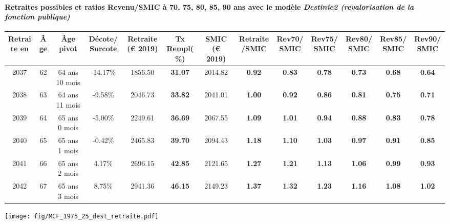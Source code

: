 \paragraph{Retraites possibles et ratios Revenu/SMIC à 70, 75, 80, 85, 90 ans avec le modèle \emph{Destinie2 (revalorisation de la fonction publique)}}  
 
{ \scriptsize \begin{center} 
\begin{tabular}[htb]{|c|c||c|c||c|c||c||c|c|c|c|c|c|} 
\hline 
 Retraite en &  Âge &  Âge pivot &  Décote/Surcote &  Retraite (\euro{} 2019) &  Tx Rempl(\%) &  SMIC (\euro{} 2019) &  Retraite/SMIC &  Rev70/SMIC &  Rev75/SMIC &  Rev80/SMIC &  Rev85/SMIC &  Rev90/SMIC \\ 
\hline \hline 
 2037 &  62 &  64 ans 10 mois &  -14.17\% &  1856.50 &  {\bf 31.07} &  2014.82 &  {\bf {\color{red} 0.92}} &  {\bf {\color{red} 0.83}} &  {\bf {\color{red} 0.78}} &  {\bf {\color{red} 0.73}} &  {\bf {\color{red} 0.68}} &  {\bf {\color{red} 0.64}} \\ 
\hline 
 2038 &  63 &  64 ans 11 mois &  -9.58\% &  2046.73 &  {\bf 33.82} &  2041.01 &  {\bf 1.00} &  {\bf {\color{red} 0.92}} &  {\bf {\color{red} 0.86}} &  {\bf {\color{red} 0.81}} &  {\bf {\color{red} 0.75}} &  {\bf {\color{red} 0.71}} \\ 
\hline 
 2039 &  64 &  65 ans 0 mois &  -5.00\% &  2249.61 &  {\bf 36.69} &  2067.55 &  {\bf 1.09} &  {\bf 1.01} &  {\bf {\color{red} 0.94}} &  {\bf {\color{red} 0.88}} &  {\bf {\color{red} 0.83}} &  {\bf {\color{red} 0.78}} \\ 
\hline 
 2040 &  65 &  65 ans 1 mois &  -0.42\% &  2465.83 &  {\bf 39.70} &  2094.43 &  {\bf 1.18} &  {\bf 1.10} &  {\bf 1.03} &  {\bf {\color{red} 0.97}} &  {\bf {\color{red} 0.91}} &  {\bf {\color{red} 0.85}} \\ 
\hline 
 2041 &  66 &  65 ans 2 mois &  4.17\% &  2696.15 &  {\bf 42.85} &  2121.65 &  {\bf 1.27} &  {\bf 1.21} &  {\bf 1.13} &  {\bf 1.06} &  {\bf {\color{red} 0.99}} &  {\bf {\color{red} 0.93}} \\ 
\hline 
 2042 &  67 &  65 ans 3 mois &  8.75\% &  2941.36 &  {\bf 46.15} &  2149.23 &  {\bf 1.37} &  {\bf 1.32} &  {\bf 1.23} &  {\bf 1.16} &  {\bf 1.08} &  {\bf 1.02} \\ 
\hline 
\hline 
\end{tabular} 
\end{center} } 

 \begin{center}\texttt{[image: fig/MCF\_1975\_25\_dest\_retraite.pdf]}\end{center} \label{fig/MCF_1975_25_dest_retraite.pdf} 

